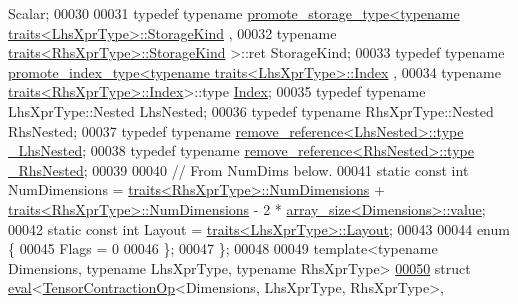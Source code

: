 \begin{DoxyCode}
      Scalar;
00030 
00031   \textcolor{keyword}{typedef} \textcolor{keyword}{typename} \hyperlink{struct_eigen_1_1internal_1_1promote__storage__type}{promote\_storage\_type<typename traits<LhsXprType>::StorageKind}
      ,
00032                                         \textcolor{keyword}{typename} \hyperlink{struct_eigen_1_1internal_1_1traits}{traits<RhsXprType>::StorageKind}
      >::ret StorageKind;
00033   \textcolor{keyword}{typedef} \textcolor{keyword}{typename} \hyperlink{struct_eigen_1_1internal_1_1promote__index__type}{promote\_index\_type<typename traits<LhsXprType>::Index}
      ,
00034                                       \textcolor{keyword}{typename} \hyperlink{struct_eigen_1_1internal_1_1traits}{traits<RhsXprType>::Index}>::type 
      \hyperlink{namespace_eigen_a62e77e0933482dafde8fe197d9a2cfde}{Index};
00035   \textcolor{keyword}{typedef} \textcolor{keyword}{typename} LhsXprType::Nested LhsNested;
00036   \textcolor{keyword}{typedef} \textcolor{keyword}{typename} RhsXprType::Nested RhsNested;
00037   \textcolor{keyword}{typedef} \textcolor{keyword}{typename} \hyperlink{group___sparse_core___module}{remove\_reference<LhsNested>::type} 
      \hyperlink{group___sparse_core___module}{\_LhsNested};
00038   \textcolor{keyword}{typedef} \textcolor{keyword}{typename} \hyperlink{group___sparse_core___module}{remove\_reference<RhsNested>::type} 
      \hyperlink{group___sparse_core___module}{\_RhsNested};
00039 
00040   \textcolor{comment}{// From NumDims below.}
00041   \textcolor{keyword}{static} \textcolor{keyword}{const} \textcolor{keywordtype}{int} NumDimensions = \hyperlink{struct_eigen_1_1internal_1_1traits}{traits<RhsXprType>::NumDimensions} + 
      \hyperlink{struct_eigen_1_1internal_1_1traits}{traits<RhsXprType>::NumDimensions} - 2 * 
      \hyperlink{struct_eigen_1_1internal_1_1array__size}{array\_size<Dimensions>::value};
00042   \textcolor{keyword}{static} \textcolor{keyword}{const} \textcolor{keywordtype}{int} Layout = \hyperlink{struct_eigen_1_1internal_1_1traits}{traits<LhsXprType>::Layout};
00043 
00044   \textcolor{keyword}{enum} \{
00045     Flags = 0
00046   \};
00047 \};
00048 
00049 \textcolor{keyword}{template}<\textcolor{keyword}{typename} Dimensions, \textcolor{keyword}{typename} LhsXprType, \textcolor{keyword}{typename} RhsXprType>
\hyperlink{struct_eigen_1_1internal_1_1eval_3_01_tensor_contraction_op_3_01_dimensions_00_01_lhs_xpr_type_0ae5a9acfb75ebc4b7f37699317bff474}{00050} \textcolor{keyword}{struct }\hyperlink{struct_eigen_1_1internal_1_1eval}{eval}<\hyperlink{class_eigen_1_1_tensor_contraction_op}{TensorContractionOp}<Dimensions, LhsXprType, RhsXprType>, 

\end{DoxyCode}
